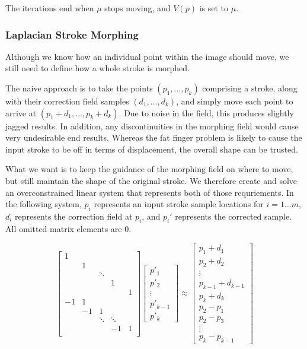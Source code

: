 The iterations end when $\mu$ stops moving, and $V(p)$ is set to $\mu$.

\subsubsection{Laplacian Stroke Morphing}



Although we know how an individual point within the image should move, we still need to define how a whole stroke is morphed.

The naive approach is to take the points $(p_1, \ldots, p_k)$ comprising a stroke, along with their correction field samples $(d_1, \ldots, d_k)$, and simply move each point to arrive at $(p_1 + d_1, \ldots, p_k + d_k)$.  Due to noise in the field, this produces slightly jagged results.  In addition, any discontinuities in the morphing field would cause very undesirable end results.   Whereas the fat finger problem is likely to cause the input stroke to be off in terms of displacement, the overall shape can be trusted.

What we want is to keep the guidance of the morphing field on where to move, but still maintain the shape of the original stroke.  We therefore create and solve an overconstrained linear system that represents both of those requriements.  In the following system, $p_i$ represents an input stroke sample locations for $i=1\ldots m$, $d_i$ represents the correction field at $p_i$, and $p_i'$ represents the corrected sample.  All omitted matrix elements are 0.


\[
\left[
\begin{array}{ccccc}
1 &  &  &  & \\
 & 1 &  &  &  \\
 &  & \ddots &   &  \\
 &  &  & 1 &  \\
  &  &  &  & 1 \\
-1 & 1 &   &  &  \\
 & -1 & 1 &  &  \\
 &  & \ddots & \ddots &  \\
 &  &  & -1 & 1 \\
\end{array}
\right]
\left[
\begin{array}{c}
p'_1 \\
p'_2 \\
\vdots \\
p'_{k-1} \\
p'_k
\end{array}
\right]
 \approx
\left[
\begin{array}{c}
p_1 + d_1\\
p_2 + d_2\\
\vdots \\
p_{k-1} + d_{k-1}\\
p_k + d_k\\
p_2-p_1 \\
p_2-p_3 \\
\vdots \\
p_k - p_{k-1}
\end{array}
\right]
\]

